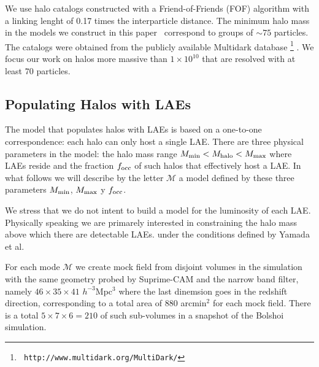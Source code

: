 \documentclass[usenatbib]{mn2e}
\newcommand{\documentname}{paper~}
\newcommand{\hMsun}{{\ifmmode{h^{-1}{\rm {M_{\odot}}}}\else{$h^{-1}{\rm{M_{\odot}}}$}\fi}}
\begin{document}
We use halo catalogs constructed with a Friend-of-Friends (FOF)
algorithm with a linking lenght of 0.17 times the interparticle
distance. 
The minimum halo mass in the models we construct in this \documentname
correspond to groups of $\sim 75$ particles. The catalogs were
obtained from the publicly available Multidark database \footnote{{\tt
    http://www.multidark.org/MultiDark/}} \citep{2011arXiv1109.0003R}.
We focus our work on halos more massive than $1\times 10^{10}$\hMsun
that are resolved with at least $70$ particles.


\subsection{Populating Halos with LAEs}
\label{subsec:mocks}

The model that populates halos with LAEs is based on a one-to-one
correspondence: each halo can only host a single LAE. There are three
physical parameters in the model: the halo mass range $M_{\rm min}<
M_{\rm halo} < M_{\rm max}$ where LAEs reside and the fraction $f_{\rm
  occ}$ of such halos that effectively host a LAE. In what follows we
will describe by the letter ${\mathcal M}$ a model defined by these
three parameters $M_{\rm min}$, $M_{\rm max}$ y $f_{\rm occ}$. 

We stress that we do not intent to build a model for the luminosity of
each LAE. Physically speaking we are primarely interested in
constraining the halo mass above which there are detectable
LAEs. under the conditions defined by Yamada et al.  

For each mode ${\mathcal M}$ we create mock field from disjoint
volumes in the simulation with the same geometry probed by Suprime-CAM
and the narrow band filter, namely $46\times 35\times 41$
$h^{-3}$Mpc$^{3}$ where the last dinemsion goes in the redshift
direction, corresponding to a total area of $880$ arcmin$^{2}$ for
each mock field. There is a total $5\times 7 \times 6=210$ of such
sub-volumes in a snapshot of the Bolshoi simulation.  
\end{document}

